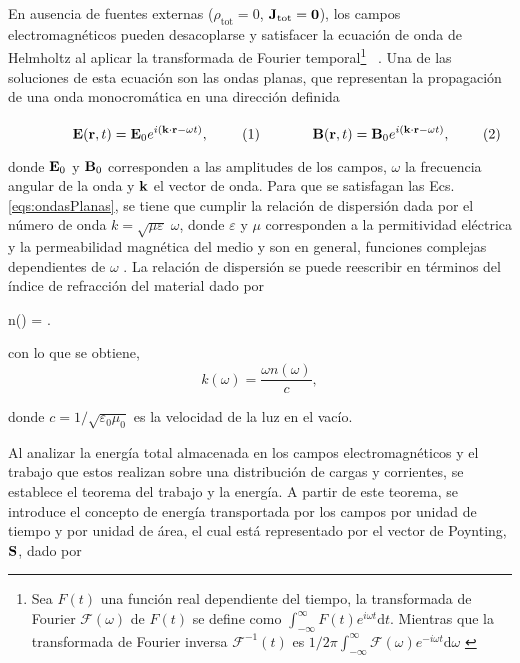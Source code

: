 En ausencia de fuentes externas (\( \rho_{\text{tot}} = 0 \), \( \vb{J}_{\text{tot}} = \vb{0} \)), los campos electromagnéticos pueden desacoplarse y satisfacer la ecuación de onda de Helmholtz al aplicar la transformada de Fourier temporal\footnote{Sea $F(t)$ una función real dependiente del tiempo, la transformada de Fourier $\mathcal{F}(\omega)$ de $F(t)$ se define como $\int_{-\infty}^{\infty}F(t)e^{i\omega t} \text{d}t$. Mientras que la transformada de Fourier inversa $\mathcal{F}^{-1}(t)$ es $1/{2\pi}\int_{-\infty}^{\infty}\mathcal{F}(\omega)e^{-i\omega t} \text{d}\omega$ \cite{arfkenMathematicalMethodsPhysicists2011a} } ~\cite{jacksonClassicalElectrodynamics2021a}. Una de las soluciones de esta ecuación son las ondas planas, que representan la propagación de una onda monocromática en una dirección definida

	\begin{subequations}%
	\eqhalf{\vb{E}(\vb{r},t) =\vb{E}_0 e^{i(\vb{k}\cdot\vb{r} -\omega t)},}\label{seq:E_plana}%
	\eqhalf{\vb{B}(\vb{r}, t) =\vb{B}_0 e^{i(\vb{k}\cdot\vb{r} -\omega t)},}	\label{seq:B_plana}
	\label{eqs:ondasPlanas}\end{subequations}\vspace*{-1em}
		
\noindent donde $\vb{E}_0$ y $\vb{B}_0$ corresponden a las amplitudes de los campos, $\omega$ la frecuencia angular de la onda y $\vb{k}$ el vector de onda. Para que se satisfagan las Ecs. \eqref{eqs:ondasPlanas}, se tiene que cumplir la relación de dispersión dada por el número de onda $k=\sqrt{\mu\varepsilon}\;\omega$, donde $\varepsilon$ y $\mu$ corresponden a la permitividad eléctrica y la permeabilidad magnética del medio y son en general, funciones complejas dependientes de $\omega$ \cite{jacksonClassicalElectrodynamics2021a}. La relación de dispersión se puede reescribir en términos del índice de refracción del material dado por \cite{jacksonClassicalElectrodynamics2021a}
%
\begin{tcolorbox}
	n(\omega) = .
	\label{eq:indice} 
\end{tcolorbox}
%	
\noindent con lo que se obtiene,
%
\begin{equation}
	k(\omega) =\dfrac{\omega n(\omega)}{c},
	\label{eq:numero_onda} 
\end{equation}

\noindent donde $c=1/\sqrt{\varepsilon_0\mu_0}$ es la velocidad de la luz en el vacío.

Al analizar la energía total almacenada en los campos electromagnéticos y el trabajo que estos realizan sobre una distribución de cargas y corrientes, se establece el teorema del trabajo y la energía. A partir de este teorema, se introduce el concepto de energía transportada por los campos por unidad de tiempo y por unidad de área, el cual está representado por el vector de Poynting, $\vb{S}$, dado por \cite{griffithsIntroductionElectrodynamics2023b}

